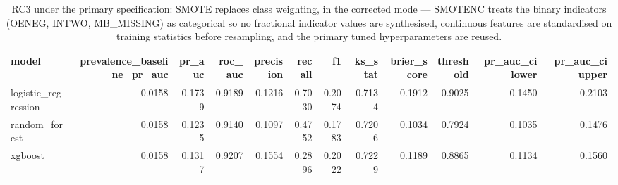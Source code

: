 \begin{table}[htbp]
\centering
\caption{RC3 under the primary specification: SMOTE replaces class weighting, in the corrected mode — SMOTENC treats the binary indicators (OENEG, INTWO, MB\_MISSING) as categorical so no fractional indicator values are synthesised, continuous features are standardised on training statistics before resampling, and the primary tuned hyperparameters are reused.}
\label{tab:v2_rc3}
\small
\begin{tabular}{lrrrrrrrrrrr}
\toprule
model & prevalence\_baseline\_pr\_auc & pr\_auc & roc\_auc & precision & recall & f1 & ks\_stat & brier\_score & threshold & pr\_auc\_ci\_lower & pr\_auc\_ci\_upper \\
\midrule
logistic\_regression & 0.0158 & 0.1739 & 0.9189 & 0.1216 & 0.7030 & 0.2074 & 0.7134 & 0.1912 & 0.9025 & 0.1450 & 0.2103 \\
random\_forest & 0.0158 & 0.1235 & 0.9140 & 0.1097 & 0.4752 & 0.1783 & 0.7206 & 0.1034 & 0.7924 & 0.1035 & 0.1476 \\
xgboost & 0.0158 & 0.1317 & 0.9207 & 0.1554 & 0.2896 & 0.2022 & 0.7229 & 0.1189 & 0.8865 & 0.1134 & 0.1560 \\
\bottomrule
\end{tabular}
\end{table}
